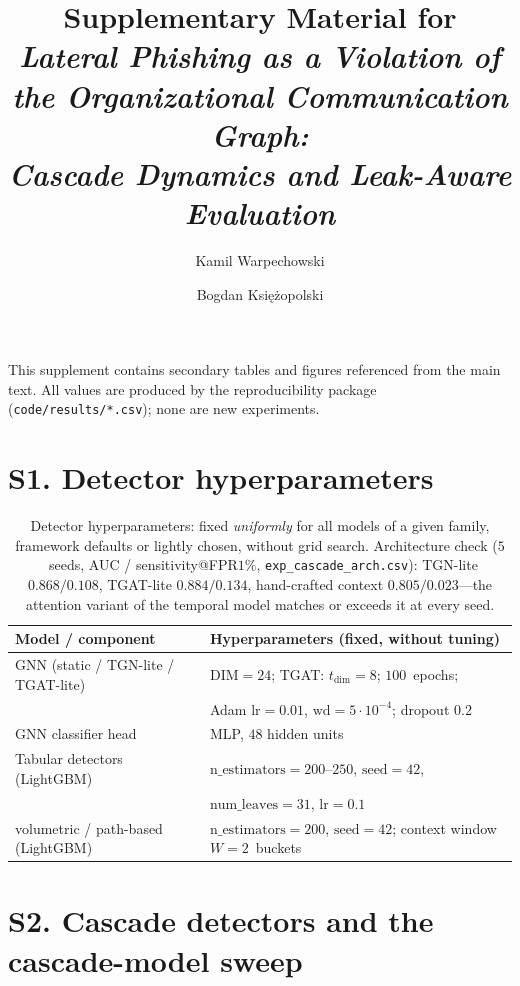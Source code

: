 \documentclass[a4paper,11pt]{article}
\title{Supplementary Material for\\
\emph{Lateral Phishing as a Violation of the Organizational Communication Graph:\\
Cascade Dynamics and Leak-Aware Evaluation}}
\author{Kamil Warpechowski \and Bogdan Ksi\k{e}\.zopolski}
\date{}
\begin{document}
\maketitle

\noindent This supplement contains secondary tables and figures referenced from the main text.
All values are produced by the reproducibility package (\texttt{code/results/*.csv}); none are new
experiments.

\section*{S1. Detector hyperparameters}

\begin{table}[h]\centering\small
\begin{tabular}{ll}
\toprule
Model / component & Hyperparameters (fixed, without tuning) \\
\midrule
GNN (static / TGN-lite / TGAT-lite) & $\mathrm{DIM}{=}24$; TGAT: $t_{\dim}{=}8$; $100$~epochs; \\
                                       & Adam $\mathrm{lr}{=}0.01$, $\mathrm{wd}{=}5\!\cdot\!10^{-4}$; dropout $0.2$ \\
GNN classifier head           & MLP, $48$ hidden units \\
Tabular detectors (LightGBM)      & $\mathrm{n\_estimators}{=}200$--$250$, $\mathrm{seed}{=}42$, \\
                                       & $\mathrm{num\_leaves}{=}31$, $\mathrm{lr}{=}0.1$ \\
volumetric / path-based (LightGBM) & $\mathrm{n\_estimators}{=}200$, $\mathrm{seed}{=}42$; context window $W{=}2$~buckets \\
\bottomrule
\end{tabular}
\caption{Detector hyperparameters: fixed \emph{uniformly} for all models of a given family, framework
defaults or lightly chosen, without grid search. Architecture check ($5$~seeds, AUC / sensitivity@FPR$1\%$,
\texttt{exp\_cascade\_arch.csv}): TGN-lite $0.868/0.108$, TGAT-lite $0.884/0.134$, hand-crafted context
$0.805/0.023$---the attention variant of the temporal model matches or exceeds it at every seed.}
\label{stab:hparams}
\end{table}

\section*{S2. Cascade detectors and the cascade-model sweep}
\end{document}

